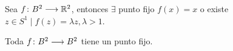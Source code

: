 \documentclass[GTSResumen.tex]{subfiles}
\begin{document}
\begin{prop} Sea $f\colon{B^2}\longrightarrow{\mathbb{R}^2}$, entonces $\exists$ punto fijo $f(x)=x$ o existe $z\in S^1 \mid f(z)=\lambda z, \lambda>1$.
\end{prop}

\begin{teorema} Toda $f\colon{B^2}\longrightarrow{B^2}$ tiene un punto fijo.
\end{teorema}

\newpage 
\end{document}
